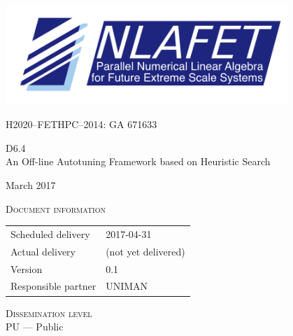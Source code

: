 \documentclass[a4paper,12pt]{article}
\def\nlafetMajor{6}
\def\nlafetMinor{4}
\def\nlafetTitle{An Off-line Autotuning Framework based on Heuristic Search}
\def\nlafetMonth{March}
\def\nlafetYear{2017}
\def\nlafetScheduledDelivery{2017-04-31}
\def\nlafetActualDelivery{(not yet delivered)}
\def\nlafetVersionMajor{0}
\def\nlafetVersionMinor{1}
\def\nlafetResponsiblePartner{UNIMAN}
\def\nlafetDisseminationLevel{PU --- Public}
\begin{document}
\begin{titlepage}
  \centering
  {
    \includegraphics[width=0.8\textwidth]{NLAFET-logo2}
  }
  \par
  \vspace{5mm}
  {
    H2020--FETHPC--2014: GA 671633
  }
  \par
  \vspace{4cm}
  {
    \Huge
    D\nlafetMajor.\nlafetMinor\\[1em]
    \nlafetTitle
  }
  \par
  \vfill
  {
    \Large
    \nlafetMonth{}
    \nlafetYear
  }
\end{titlepage}



%

\newpage

\noindent
\textsc{Document information}\\[1em]
\begin{tabular}{@{}ll}
  Scheduled delivery & \nlafetScheduledDelivery \\
  Actual delivery & \nlafetActualDelivery \\
  Version & \nlafetVersionMajor.\nlafetVersionMinor \\
  Responsible partner & \nlafetResponsiblePartner \\
\end{tabular}

\vspace{2em}

\noindent
\textsc{Dissemination level}\\[1em]
\nlafetDisseminationLevel
\end{document}
